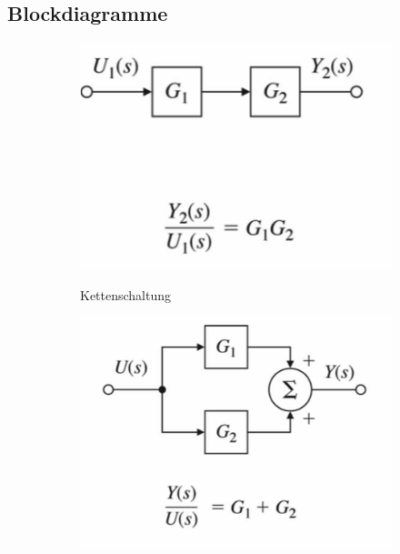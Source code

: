 \subsection{Blockdiagramme}
\begin{tcolorbox}[colback=white!10!white,colframe=blue!50!black,title=Regeln]
    
    \begin{figure}[H]
        \begin{subfigure}{.3\textwidth}
            \centering
            \includegraphics[width=1\textwidth]{content/img/kettenschaltung}
            \label{fig:kettenschaltung}
            \caption{Kettenschaltung}
        \end{subfigure}%
        \begin{subfigure}{.3\textwidth}
    \centering
    \includegraphics[width=1\textwidth]{content/img/parallel}

\end{subfigure}
\end{figure}
\end{tcolorbox}
